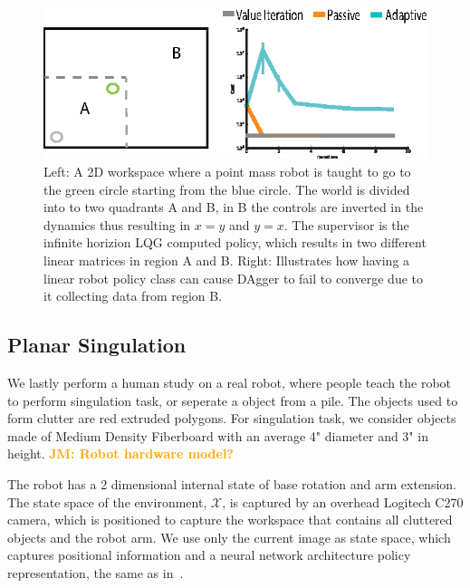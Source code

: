 \documentclass[10pt, conference]{ieeeconf}      %
\newcommand{\jmnote}[1]{%
 {\textcolor{orange}{\textbf{JM: #1}}}{}}
\begin{document}
\begin{figure}
\centering
\includegraphics{f_figs/p_mass.eps}
\caption{
    \footnotesize
Left: A 2D workspace where a point mass robot is taught to go to the green circle starting from the blue circle. The world is divided into to two quadrants A and B, in B the controls are inverted in the dynamics thus resulting in $x=y$ and $y=x$. The supervisor is the infinite horizion LQG computed policy, which results in two different linear matrices in region A and B. Right: Illustrates how having a linear robot policy class can cause DAgger to fail  to converge due to it collecting data from region B.  }
\vspace*{-1pt}
\label{fig:p_mass}
\end{figure}

\subsection{Planar Singulation}
We lastly perform a human study on a real robot, where people teach the robot to perform singulation task, or seperate a object from a pile. The objects used to form clutter are red extruded polygons.  For singulation task, we consider objects made of Medium Density Fiberboard with an average 4" diameter and 3" in height. \jmnote{Robot hardware model?}

The robot has a 2 dimensional internal state of base rotation and arm extension. The state space of the environment, $\mathcal{X}$, is captured by  an overhead Logitech C270 camera, which is positioned to capture the workspace that contains all cluttered objects and the robot arm. We use only the current image as state space, which captures positional information and a neural network architecture policy representation, the same as in~\cite{laskeyrobot}.
\end{document}
